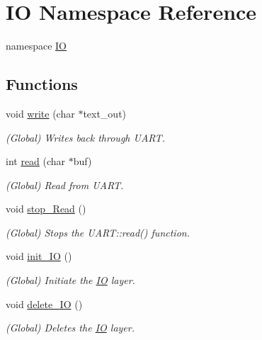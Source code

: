 \hypertarget{namespace_i_o}{}\section{IO Namespace Reference}
\label{namespace_i_o}


namespace \mbox{\hyperlink{namespace_i_o}{IO}}  


\subsection*{Functions}
\begin{DoxyCompactItemize}
\item 
void \mbox{\hyperlink{namespace_i_o_a20b32a5769a95ed363726431c01702e9}{write}} (char $\ast$text\+\_\+out)
\begin{DoxyCompactList}\small\item\em (Global) Writes back through U\+A\+RT. \end{DoxyCompactList}\item 
int \mbox{\hyperlink{namespace_i_o_a1087fba97ca797e5ca155228ff9eec55}{read}} (char $\ast$buf)
\begin{DoxyCompactList}\small\item\em (Global) Read from U\+A\+RT. \end{DoxyCompactList}\item 
void \mbox{\hyperlink{namespace_i_o_a04c5db8c053f07761c5c09894a4bd49d}{stop\+\_\+\+Read}} ()
\begin{DoxyCompactList}\small\item\em (Global) Stops the U\+A\+R\+T\+::read() function. \end{DoxyCompactList}\item 
void \mbox{\hyperlink{namespace_i_o_a83055f0dd9e551c9e898a69d48530663}{init\+\_\+\+IO}} ()
\begin{DoxyCompactList}\small\item\em (Global) Initiate the \mbox{\hyperlink{namespace_i_o}{IO}} layer. \end{DoxyCompactList}\item 
void \mbox{\hyperlink{namespace_i_o_a71df3822c66f8b597b92e7e906a9d61f}{delete\+\_\+\+IO}} ()
\begin{DoxyCompactList}\small\item\em (Global) Deletes the \mbox{\hyperlink{namespace_i_o}{IO}} layer. \end{DoxyCompactList}\end{DoxyCompactItemize}


